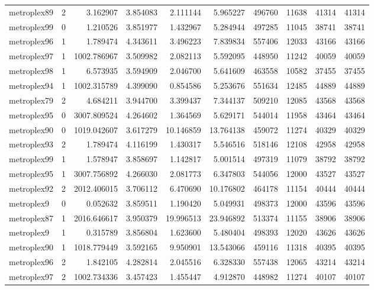 \documentclass[../../../thesis.tex]{subfiles}
\begin{document}
\begin{longtable}{|l|r|r|r|r|r|r|r|r|r|}
metroplex89 & 2 & 3.162907 & 3.854083 & 2.111144 & 5.965227 & 496760 & 11638 & 41314 & 41314 \\
metroplex99 & 0 & 1.210526 & 3.851977 & 1.432967 & 5.284944 & 497285 & 11045 & 38741 & 38741 \\
metroplex96 & 1 & 1.789474 & 4.343611 & 3.496223 & 7.839834 & 557406 & 12033 & 43166 & 43166 \\
metroplex97 & 1 & 1002.786967 & 3.509982 & 2.082113 & 5.592095 & 448950 & 11242 & 40059 & 40059 \\
metroplex98 & 1 & 6.573935 & 3.594909 & 2.046700 & 5.641609 & 463558 & 10582 & 37455 & 37455 \\
metroplex94 & 1 & 1002.315789 & 4.399090 & 0.854586 & 5.253676 & 551634 & 12485 & 44889 & 44889 \\
metroplex79 & 2 & 4.684211 & 3.944700 & 3.399437 & 7.344137 & 509210 & 12085 & 43568 & 43568 \\
metroplex95 & 0 & 3007.809524 & 4.264602 & 1.364569 & 5.629171 & 544014 & 11958 & 43464 & 43464 \\
metroplex90 & 0 & 1019.042607 & 3.617279 & 10.146859 & 13.764138 & 459072 & 11274 & 40329 & 40329 \\
metroplex93 & 2 & 1.789474 & 4.116199 & 1.430317 & 5.546516 & 518146 & 12108 & 42958 & 42958 \\
metroplex99 & 1 & 1.578947 & 3.858697 & 1.142817 & 5.001514 & 497319 & 11079 & 38792 & 38792 \\
metroplex95 & 1 & 3007.756892 & 4.266030 & 2.081773 & 6.347803 & 544056 & 12000 & 43527 & 43527 \\
metroplex92 & 2 & 2012.406015 & 3.706112 & 6.470690 & 10.176802 & 464178 & 11154 & 40444 & 40444 \\
metroplex9 & 0 & 0.052632 & 3.859511 & 1.190420 & 5.049931 & 498373 & 12000 & 43596 & 43596 \\
metroplex87 & 1 & 2016.646617 & 3.950379 & 19.996513 & 23.946892 & 513374 & 11155 & 38906 & 38906 \\
metroplex9 & 1 & 0.315789 & 3.856804 & 1.623600 & 5.480404 & 498393 & 12020 & 43626 & 43626 \\
metroplex90 & 1 & 1018.779449 & 3.592165 & 9.950901 & 13.543066 & 459116 & 11318 & 40395 & 40395 \\
metroplex96 & 2 & 1.842105 & 4.282814 & 2.045516 & 6.328330 & 557438 & 12065 & 43214 & 43214 \\
metroplex97 & 2 & 1002.734336 & 3.457423 & 1.455447 & 4.912870 & 448982 & 11274 & 40107 & 40107 \\

\end{longtable}
\end{document}
